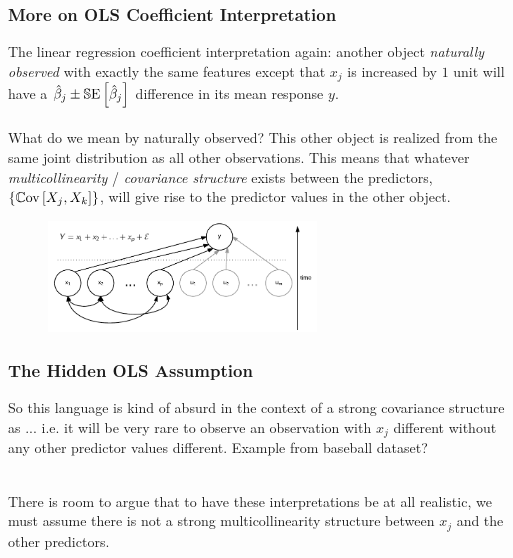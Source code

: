 \documentclass[handout]{beamer}
\begin{document}
\begin{frame}\frametitle{More on OLS Coefficient Interpretation}

\small
The linear regression coefficient interpretation again: another object \emph{naturally observed} with exactly the same features except that $x_j$ is increased by $1$ unit will have a $\hat{\beta}_j \pm \mathbb{S}\text{E}\left[\hat{\beta}_j\right]$ difference in its mean response $y$.\\~\\

What do we mean by naturally observed? \pause This other object is realized from the same joint distribution as all other observations. This means that whatever \textit{multicollinearity} / \textit{covariance structure} exists between the predictors, $\left\{\mathbb{C}\text{ov}\left[X_j, X_k\right]\right\}$, will give rise to the predictor values in the other object.
	
\begin{figure}
\centering
\includegraphics[width=2.8in]{predictor_covariance_structure}
\end{figure}

\end{frame}

\begin{frame}\frametitle{The Hidden  OLS Assumption}

So this language  is \pause kind of absurd in the context of a strong covariance structure as ... \pause i.e. it will be very rare to observe an observation with $x_j$ different without any other predictor values different. Example from baseball dataset? \\~\\ \pause 

There is room to argue that to have these interpretations be at all realistic, we must assume there is not a strong multicollinearity structure between $x_j$ and the other predictors.
	
\end{frame}
\end{document}
